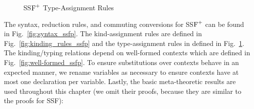\begin{figure}
  \setlength{\tabcolsep}{1pt}
    
    \caption[]{SS$\mbox{F}^{+}$ Type-Assignment Rules}
    \label{fig:typing_rules_ssfp}
  
\end{figure}
The syntax, reduction rules, and commuting conversions for SS$\mbox{F}^{+}$ can
be found in Fig.~\ref{fig:syntax_ssfp}.  The kind-assignment rules are
defined in Fig.~\ref{fig:kinding_rules_ssfp} and the type-assignment
rules in defined in Fig.~\ref{fig:typing_rules_ssfp}. The
kinding/typing relations depend on well-formed contexts which are
defined in Fig.~\ref{fig:well-formed_ssfp}.  To ensure substitutions
over contexts behave in an expected manner, we rename variables as
necessary to ensure contexts have at most one declaration per
variable.  Lastly, the basic meta-theoretic results are used
throughout this chapter (we omit their proofs, because they are
similar to the proofs for SSF):


